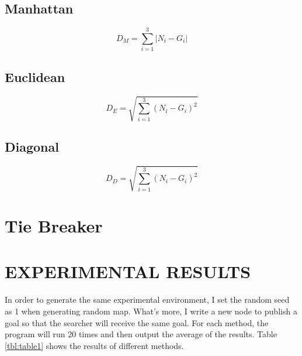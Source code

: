 \documentclass[conference]{IEEEtran}
\begin{document}
\subsection{Manhattan}

\begin{equation}
D_{M}=\sum_{i=1}^{3}{|N_i-G_i|}  \label{H1}
\end{equation}


\subsection{Euclidean}

\begin{equation}
D_{E}=\sqrt{\sum_{i=1}^{3}{(N_i-G_i)^2}} \label{H2}
\end{equation}

\subsection{Diagonal}

\begin{equation}
D_{D}=\sqrt{\sum_{i=1}^{3}{(N_i-G_i)^2}} \label{H3}
\end{equation}

\section{Tie Breaker}



\section{EXPERIMENTAL RESULTS}
In order to generate the same experimental environment, I set the random seed as 1 when generating random map. What's more, I write a new node to publish a goal so that the searcher will receive the same goal. For each method, the program will run 20 times and then output the average of the results. Table \ref {tbl:table1} shows the results of different methods. 
\end{document}

